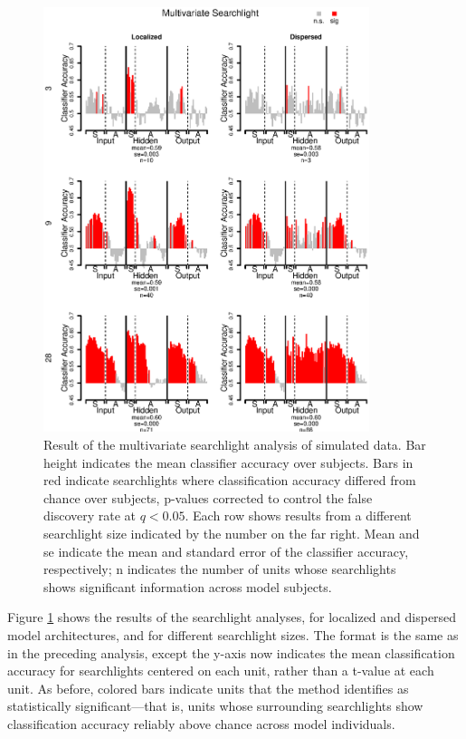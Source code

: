 \begin{figure}
\centering
\includegraphics[width=0.85\textwidth]{figures/searchlight.eps}
\caption{Result of the multivariate searchlight analysis of simulated data. Bar height indicates the mean classifier accuracy over subjects. Bars in red indicate searchlights where classification accuracy differed from chance over subjects, p-values corrected to control the false discovery rate at $q<0.05$. Each row shows results from a different searchlight size indicated by the number on the far right. Mean and se indicate the mean and standard error of the classifier accuracy, respectively; n indicates the number of units whose searchlights shows significant information across model subjects.}
\label{fig.searchlight} 
\end{figure}

Figure \ref{fig.searchlight} shows the results of the searchlight analyses, for localized and dispersed model architectures, and for different searchlight sizes. The format is the same as in the preceding analysis, except the y-axis now indicates the mean classification accuracy for searchlights centered on each unit, rather than a t-value at each unit. As before, colored bars indicate units that the method identifies as statistically significant---that is, units whose surrounding searchlights show classification accuracy reliably above chance across model individuals.

